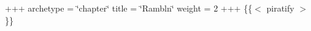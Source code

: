 +++ archetype = \char`\"{}chapter\char`\"{} title = \char`\"{}\+Rambl\textquotesingle{}n\char`\"{} weight = 2 +++ \{\{$<$ piratify $>$\}\} 